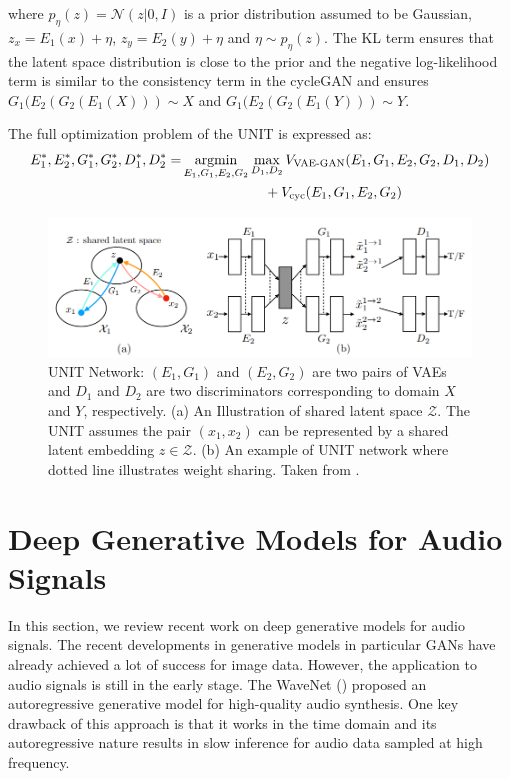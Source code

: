 where $p_{\eta}(z)=\mathcal{N}(z|0,I)$ is a prior distribution assumed to be Gaussian,  $z_x = E_1(x) + \eta$, $z_y = E_2(y) + \eta$ and $\eta \sim p_{\eta}(z)$.
The KL term ensures that the latent space distribution is close to the prior and the negative log-likelihood term is similar to the consistency term in the cycleGAN and ensures $G_1(E_2(G_2(E_1(X)))\sim X$ and $G_1(E_2(G_2(E_1(Y)))\sim Y$. 

The full optimization problem of the UNIT is expressed as:
\begin{equation}
    \begin{aligned}
        E_1^\ast, E_2^\ast, G_1^\ast, G_2^\ast, D_1^\ast, D_2^\ast =& \operatorname*{argmin}_{E_1,G_1,E_2,G_2} \max_{D_1, D_2} V_\text{VAE-GAN} (E_1,G_1,E_2,G_2,D_1,D_2)\\
        &\qquad \qquad \qquad +  V_\text{cyc}(E_1,G_1,E_2,G_2)
    \end{aligned}
\end{equation}

\begin{figure}
    \centering
    \includegraphics[width=0.95\columnwidth]{master_thesis_template/figs/unit.PNG}
    \caption[Illustration of UNIT Framework]{UNIT Network:  $(E_1,G_1)$ and $(E_2,G_2)$ are two pairs of VAEs and $D_1$ and $D_2$ are two discriminators corresponding to domain $X$ and $Y$, respectively. (a) An Illustration of shared latent space $\mathcal{Z}$. The UNIT assumes the pair $(x_1,x_2)$ can be represented by a shared latent embedding $z\in\mathcal{Z}$. (b) An example of UNIT network where dotted line illustrates weight sharing. Taken from \citet{liu2017unsupervised}.}
    \label{fig:vae-gan}
\end{figure}



\section{Deep Generative Models for Audio Signals}
\label{subsec:dganaudio}
In this section, we review recent work on deep generative models for audio signals. The recent developments in generative models in particular GANs have already achieved a lot of success for image data. However, the application to audio signals is still in the early stage. The WaveNet (\cite{oord2016wavenet}) proposed an autoregressive generative model for high-quality audio synthesis. One key drawback of this approach is that it works in the time domain and its autoregressive nature results in slow inference for audio data sampled at high frequency. 

